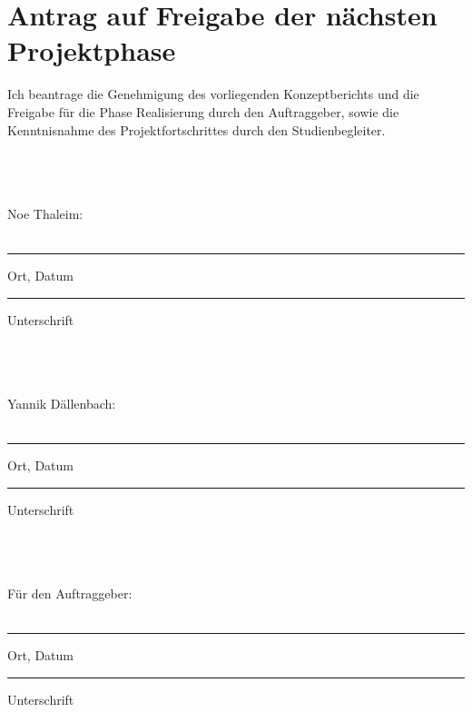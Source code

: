 \section{Antrag auf Freigabe der nächsten Projektphase}
Ich beantrage die Genehmigung des vorliegenden Konzeptberichts und die Freigabe für die Phase Realisierung durch den Auftraggeber, sowie die Kenntnisnahme des Projektfortschrittes durch den Studienbegleiter.

\\ \\ \\
Noe Thaleim:
\\ \\
\parbox{4cm}{\hrule
\strut \centering\footnotesize Ort, Datum} \hfill\parbox{4cm}{\hrule
\strut \centering\footnotesize Unterschrift}
\\ \\ \\
Yannik Dällenbach:
\\ \\
\parbox{4cm}{\hrule
\strut \centering\footnotesize Ort, Datum} \hfill\parbox{4cm}{\hrule
\strut \centering\footnotesize Unterschrift}
\\ \\ \\
Für den Auftraggeber:
\\ \\
\parbox{4cm}{\hrule
\strut \centering\footnotesize Ort, Datum} \hfill\parbox{4cm}{\hrule
\strut \centering\footnotesize Unterschrift}
